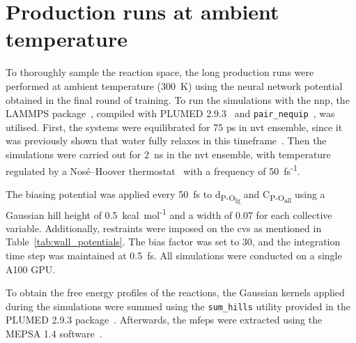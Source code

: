
\section{Production runs at ambient temperature}
To thoroughly sample the reaction space, the long production runs were performed at ambient temperature (300~K) using the neural network potential obtained in the final round of training. To run the simulations with the \ac{nnp}, the LAMMPS package~\citep{thompsonLAMMPSFlexibleSimulation2022}, compiled with PLUMED 2.9.3~\citep{tribelloPLUMED2New2014} and \texttt{pair\_nequip}~\citep{MirgroupPair_nequip}, was utilised. First, the systems were equilibrated for 75 ps in \ac{nvt} ensemble, since it was previously shown that water fully relaxes in this timeframe~\citep{moronMacroNanoScale2016}. Then the simulations were carried out for 2~ns in the \ac{nvt} ensemble, with temperature regulated by a Nos\'e--Hoover thermostat~\citep{noseUnifiedFormulationConstant1984, hooverCanonicalDynamicsEquilibrium1985} with a frequency of 50~fs\textsuperscript{-1}.

The biasing potential was applied every 50~fs to d\textsubscript{P-O\textsubscript{lg}} and C\textsubscript{P-O\textsubscript{all}} using a Gaussian hill height of 0.5~kcal~mol\textsuperscript{-1} and a width of 0.07 for each collective variable. Additionally, restraints were imposed on the \acp{cv} as mentioned in Table~\ref{tab:wall_potentials}. The bias factor was set to 30, and the integration time step was maintained at 0.5~fs. All simulations were conducted on a single A100 GPU.

To obtain the free energy profiles of the reactions, the Gaussian kernels applied during the simulations were summed using the \texttt{sum\_hills} utility provided in the PLUMED 2.9.3 package~\citep{tribelloPLUMED2New2014}. Afterwards, the \acp{mfep} were extracted using the MEPSA 1.4 software~\citep{marcos-alcaldeMEPSAMinimumEnergy2015}. 


